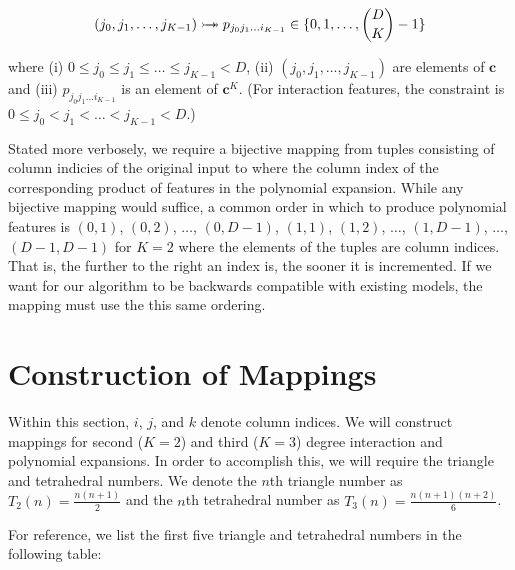 \documentclass{article}
\begin{document}
\begin{equation}
(j_0, j_1, \dots, j_{K-1}) \rightarrowtail \hspace{-1.9ex} \twoheadrightarrow p_{j_0j_1 \dots i_{K-1}} \in \{0,1,\dots,\binom{D}{K}-1\} 
\end{equation}

where (i) $ 0 \le j_0 \le j_1 \le \dots \le j_{K-1} < D$, (ii) $(j_0, j_1, \dots, j_{K-1})$ are elements of $\bm{c}$ and (iii) $p_{j_0j_1 \dots i_{K-1}}$ is an element of $\bm{c}^K$. (For interaction features, the constraint is $ 0 \le j_0 < j_1 < \dots < j_{K-1} < D$.)

Stated more verbosely, we require a bijective mapping from tuples consisting of column indicies of the original input to where the column index of the corresponding product of features in the polynomial expansion.
While any bijective mapping would suffice, a common order in which to produce polynomial features is $(0, 1)$, $(0, 2)$, $\dots$, $(0, D-1)$, $(1, 1)$, $(1, 2)$, $\dots$, $(1, D-1)$, $\dots$, $(D-1, D-1)$ for $K=2$ where the elements of the tuples are column indices.
That is, the further to the right an index is, the sooner it is incremented.
If we want for our algorithm to be backwards compatible with existing models, the mapping must use the this same ordering.


\section{Construction of Mappings}

Within this section, $i$, $j$, and $k$ denote column indices.
We will construct mappings for second ($K=2$) and third ($K=3$) degree interaction and polynomial expansions.
In order to accomplish this, we will require the triangle and tetrahedral numbers.
We denote the $n$th triangle number as $T_2(n) = \frac{n(n+1)}{2}$ and the $n$th tetrahedral number as $T_3(n) = \frac{n(n+1)(n+2)}{6}$.

For reference, we list the first five triangle and tetrahedral numbers in the following table:
\end{document}
